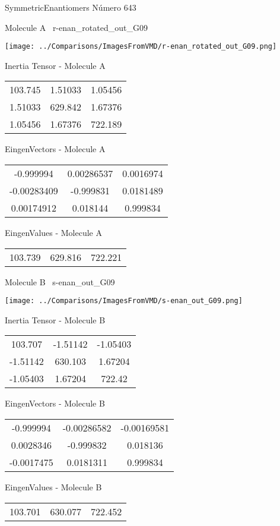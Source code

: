 \vtab[-3cm]
\begin{center}
{\large SymmetricEnantiomers \tab Número 643}
\end{center}
\begin{multicols}{2}
\begin{center}

Molecule A \
r-enan\_rotated\_out\_G09

\texttt{[image: ../Comparisons/ImagesFromVMD/r-enan\_rotated\_out\_G09.png]}

Inertia Tensor - Molecule A \\
\begin{tabular}{|c c c|}
103.745	 & 	1.51033	 & 	1.05456	 \\
1.51033	 & 	629.842	 & 	1.67376	 \\
1.05456	 & 	1.67376	 & 	722.189
\end{tabular}

\vtab
 EingenVectors - Molecule A     \\
\begin{tabular}{|c c c|}
-0.999994	 & 	0.00286537	 & 	0.0016974	 \\
-0.00283409	 & 	-0.999831	 & 	0.0181489	 \\
0.00174912	 & 	0.018144	 & 	0.999834
\end{tabular}

\vtab
 EingenValues - Molecule A     \\
\begin{tabular}{|c c c|}
103.739	 & 	629.816	 & 	722.221	 \\
\end{tabular}
\columnbreak

Molecule B \
s-enan\_out\_G09

\texttt{[image: ../Comparisons/ImagesFromVMD/s-enan\_out\_G09.png]}

Inertia Tensor - Molecule B \\
\begin{tabular}{|c c c|}
103.707	 & 	-1.51142	 & 	-1.05403	 \\
-1.51142	 & 	630.103	 & 	1.67204	 \\
-1.05403	 & 	1.67204	 & 	722.42
\end{tabular}

\vtab
 EingenVectors - Molecule B     \\
\begin{tabular}{|c c c|}
-0.999994	 & 	-0.00286582	 & 	-0.00169581	 \\
0.0028346	 & 	-0.999832	 & 	0.018136	 \\
-0.0017475	 & 	0.0181311	 & 	0.999834
\end{tabular}

\vtab
 EingenValues - Molecule B     \\
\begin{tabular}{|c c c|}
103.701	 & 	630.077	 & 	722.452	 \\
\end{tabular}

\end{center}
\end{multicols}

